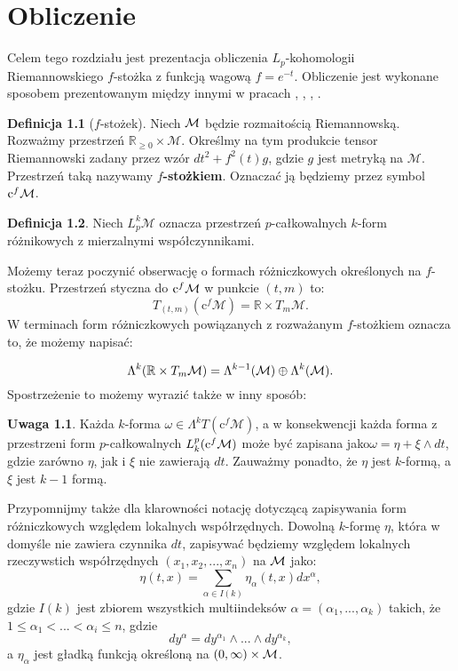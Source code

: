 \documentclass[licencjacka]{pracamgr}
\theoremstyle{definition}
\newtheorem{definition}{Definicja}[section]
\theoremstyle{definition}
\newtheorem{remark}{Uwaga}[section]
\theoremstyle{plain}
\theoremstyle{plain}
\def\cfm{\ensuremath\mathrm{c}^f\mathcal{M}}
\def\M{\ensuremath\mathcal{M}}
\begin{document}
\chapter{Obliczenie}

Celem tego rozdziału jest prezentacja obliczenia 
$L_p$-kohomologii Riemannowskiego $f$-stożka z funkcją wagową $f = e^{-t}$.
Obliczenie jest wykonane sposobem prezentowanym między innymi w
pracach \cite{cheeger}, \cite{youssin}, \cite{kirwan}, \cite{weber}.

\begin{definition}[$f$-stożek]
    Niech $\M$ będzie rozmaitością Riemannowską. Rozważmy przestrzeń
    $\mathbb{R}_{\geq 0} \times \mathcal{M}$. Określmy na tym produkcie tensor
    Riemannowski zadany przez wzór $dt^2 + f^{2}(t)g $, gdzie $g$ jest
    metryką na $\mathcal{M}$.  Przestrzeń taką nazywamy \textbf{$f$-stożkiem}.
    Oznaczać ją będziemy przez symbol $\cfm$.
\end{definition}

\begin{definition}
  Niech $L_p^k \mathcal{M}$ oznacza przestrzeń $p$-całkowalnych 
  $k$-form różnikowych z mierzalnymi  współczynnikami.
\end{definition}



Możemy teraz poczynić obserwację o formach różniczkowych określonych na 
$f$-stożku. Przestrzeń styczna do $\cfm$ w punkcie $(t, m)$ to:
\[
    T_{(t, m)} (\mathrm{c}^f \mathcal{M}) = \mathbb{R} \times T_m \mathcal{M}.
\]
W terminach form różniczkowych powiązanych z rozważanym $f$-stożkiem oznacza to, 
że możemy napisać:

\[
\Lambda^k(\mathbb{R} \times T_m \M) = 
\Lambda^{k-1}(\M)  \oplus \Lambda^k(\M).
\]
Spostrzeżenie to możemy wyrazić także w inny sposób: 

\begin{remark}
Każda $k$-forma $\omega \in \Lambda^k T(\mathrm{c}^f \mathcal{M})$, 
a w konsekwencji każda forma z przestrzeni form $p$-całkowalnych  $L_k^p
(\cfm)$ może być zapisana jako$\omega = \eta + \xi \wedge dt$,
gdzie zarówno $\eta$, jak i  $\xi$ nie zawierają $dt$.  Zauważmy ponadto,
że $\eta$ jest $k$-formą, a $\xi$ jest $k-1$ formą. \\
\end{remark}

Przypomnijmy także dla klarowności notację dotyczącą zapisywania form różniczkowych
względem lokalnych współrzędnych. Dowolną $k$-formę $\eta$, która w domyśle nie zawiera
czynnika $dt$, zapisywać będziemy względem lokalnych rzeczywstich współrzędnych
$(x_1, x_2, ... , x_n)$ na $\M$ jako:
\[
    \eta(t, x) = \sum_{\alpha \in I(k)} \eta_\alpha (t, x) dx^\alpha,
\]
gdzie $I(k)$ jest zbiorem wszystkich multiindeksów $\alpha = (\alpha_1, ...,
\alpha_k)$ takich, że $1 \leq \alpha_1 < ... < \alpha_i \leq n$, gdzie
\begin{equation}\label{notacja}
    dy^\alpha = dy^{\alpha_1} \wedge ... \wedge dy^{\alpha_k},
\end{equation}
a $\eta_\alpha$ jest gładką funkcją określoną na $(0, \infty) \times \M$. \\
\end{document}
